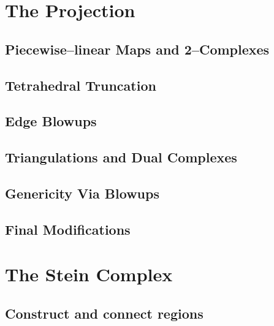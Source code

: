 \label{cha:alg1}



\section{The Projection}
\label{sec:proj}


	\subsection{Piecewise--linear Maps and 2--Complexes}
	\label{sub:2complex}
	
	
	\subsection{Tetrahedral Truncation}
	\label{sub:truncttet}
	
	
	\subsection{Edge Blowups}
	\label{sub:edgeblowup}
	
	
	\subsection{Triangulations and Dual Complexes}
	\label{sub:tridual}
	
	
	\subsection{Genericity Via Blowups}
	\label{sub:genericity}
	
		
	\subsection{Final Modifications}
	

\section{The Stein Complex}
\label{sec:stein}

	\subsection{Construct and connect regions}
	
	
